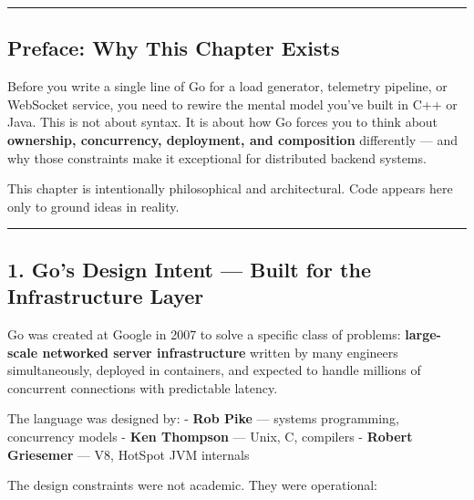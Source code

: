 \documentclass[
]{article}
\begin{document}
\begin{center}\rule{0.5\linewidth}{0.5pt}\end{center}

\hypertarget{preface-why-this-chapter-exists}{%
\subsection{Preface: Why This Chapter
Exists}\label{preface-why-this-chapter-exists}}

Before you write a single line of Go for a load generator, telemetry
pipeline, or WebSocket service, you need to rewire the mental model
you've built in C++ or Java. This is not about syntax. It is about how
Go forces you to think about \textbf{ownership, concurrency, deployment,
and composition} differently --- and why those constraints make it
exceptional for distributed backend systems.

This chapter is intentionally philosophical and architectural. Code
appears here only to ground ideas in reality.

\begin{center}\rule{0.5\linewidth}{0.5pt}\end{center}

\hypertarget{gos-design-intent-built-for-the-infrastructure-layer}{%
\subsection{1. Go's Design Intent --- Built for the Infrastructure
Layer}\label{gos-design-intent-built-for-the-infrastructure-layer}}

Go was created at Google in 2007 to solve a specific class of problems:
\textbf{large-scale networked server infrastructure} written by many
engineers simultaneously, deployed in containers, and expected to handle
millions of concurrent connections with predictable latency.

The language was designed by: - \textbf{Rob Pike} --- systems
programming, concurrency models - \textbf{Ken Thompson} --- Unix, C,
compilers - \textbf{Robert Griesemer} --- V8, HotSpot JVM internals

The design constraints were not academic. They were operational:
\end{document}

